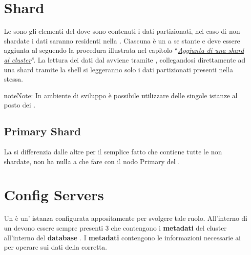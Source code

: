 \documentclass[a4paper,10pt,english]{sphinxmanual}
\begin{document}
\section{Shard}
\label{cluster_architecture/architecture:shard}\label{cluster_architecture/architecture:id3}
Le  sono gli elementi del {\hyperref[cluster_architecture/architecture:cluster]{\emph{}}} dove sono contenuti i dati partizionati, nel caso
di  non shardate i dati saranno residenti nella {\hyperref[cluster_architecture/architecture:primary-shard]{\emph{}}}.
Ciascuna  è un {\hyperref[cluster_architecture/architecture:replica-set]{\emph{}}} a se stante e deve essere aggiunta al {\hyperref[cluster_architecture/architecture:cluster]{\emph{}}}
seguendo la procedura illustrata nel capitolo ``{\hyperref[cluster_architecture/add_shard::doc]{\emph{\emph{Aggiunta di una shard al cluster}}}}''.
La lettura dei dati dal {\hyperref[cluster_architecture/architecture:cluster]{\emph{}}} avviene tramite {\hyperref[cluster_architecture/architecture:mongos]{\emph{}}}, collegandosi direttamente
ad una shard tramite la shell  si leggeranno solo i dati partizionati presenti nella
 stessa.

\begin{notice}{note}{Note:}
In ambiente di sviluppo è possibile utilizzare delle singole istanze  al posto
dei     {\hyperref[cluster_architecture/architecture:replica-set]{\emph{}}}.
\end{notice}


\subsection{Primary Shard}
\label{cluster_architecture/architecture:primary-shard}\label{cluster_architecture/architecture:id4}
La  si differenzia dalle altre {\hyperref[cluster_architecture/architecture:shard]{\emph{}}} per il semplice fatto che contiene
tutte le  non shardate, non ha nulla a che fare con il nodo Primary del
{\hyperref[cluster_architecture/architecture:replica-set]{\emph{}}}.


\section{Config Servers}
\label{cluster_architecture/architecture:config-servers}\label{cluster_architecture/architecture:config-server}
Un  è un' istanza  configurata appositamente per svolgere tale ruolo.
All'interno di un {\hyperref[cluster_architecture/architecture:cluster]{\emph{}}} devono essere sempre presenti 3  che contengono i
\textbf{metadati} del cluster all'interno del \textbf{database} .
I \textbf{metadati} contengono le informazioni necessarie ai {\hyperref[cluster_architecture/architecture:mongos]{\emph{}}} per operare sui dati della
{\hyperref[cluster_architecture/architecture:shard]{\emph{}}} corretta.
\end{document}
